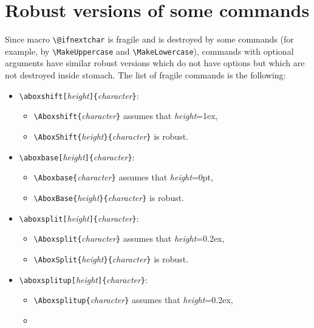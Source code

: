 \section{Robust versions of some commands\label{S-robust}}

Since \LaTeXe{} macro \verb?\@ifnextchar? is fragile and is
destroyed by some \LaTeXe{} commands (for example,
by \verb?\MakeUppercase? and \verb?\MakeLowercase?),
commands with optional arguments
have similar robust versions which do not have options but which
are not destroyed inside \LaTeXe{} stomach.
The list of fragile commands is the following:
\begin{itemize}
\item \verb?\aboxshift[?{\em height}\verb?]{?{\em character}\verb?}?:
        \begin{itemize}
        \item
        \verb?\Aboxshift{?{\em character}\verb?}?
        assumes that {\em height}=\textsf{1ex},
        \item
        \verb?\AboxShift{?{\em height}\verb?}{?{\em character}\verb?}?
        is robust.
        \end{itemize}
\item \verb?\aboxbase[?{\em height}\verb?]{?{\em character}\verb?}?:
        \begin{itemize}
        \item
        \verb?\Aboxbase{?{\em character}\verb?}?
        assumes that {\em height}=\textsf{0pt},
        \item
        \verb?\AboxBase{?{\em height}\verb?}{?{\em character}\verb?}?
        is robust.
        \end{itemize}
\item \verb?\aboxsplit[?{\em height}\verb?]{?{\em character}\verb?}?:
        \begin{itemize}
        \item
        \verb?\Aboxsplit{?{\em character}\verb?}?
        assumes that {\em height}=\textsf{0.2ex},
        \item
        \verb?\AboxSplit{?{\em height}\verb?}{?{\em character}\verb?}?
        is robust.
        \end{itemize}
\item \verb?\aboxsplitup[?{\em height}\verb?]{?{\em character}\verb?}?:
        \begin{itemize}
        \item
        \verb?\Aboxsplitup{?{\em character}\verb?}?
        assumes that {\em height}=\textsf{0.2ex},
        \item

\end{itemize}
\end{itemize}
